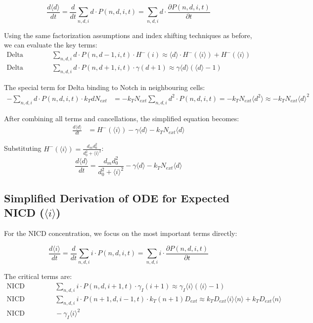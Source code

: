 \documentclass{article}
\begin{document}
\begin{flushleft}
$$\frac{d\langle d \rangle}{dt} = \frac{d}{dt}\sum_{n,d,i} d \cdot P(n,d,i,t) = \sum_{n,d,i} d \cdot \frac{\partial P(n,d,i,t)}{\partial t}$$

Using the same factorization assumptions and index shifting techniques as before, we can evaluate the key terms:
\begin{align*}
\text{Delta production term:} &\quad \sum_{n,d,i} d \cdot P(n,d-1,i,t) \cdot H^-(i) \approx \langle d \rangle \cdot H^-(\langle i \rangle) + H^-(\langle i \rangle) \\
\text{Delta decay term:} &\quad \sum_{n,d,i} d \cdot P(n,d+1,i,t) \cdot \gamma(d+1) \approx \gamma \langle d \rangle (\langle d \rangle - 1)
\end{align*}

The special term for Delta binding to Notch in neighbouring cells:
\begin{align*}
-\sum_{n,d,i} d \cdot P(n,d,i,t) \cdot k_T d N_{ext} &= -k_T N_{ext} \sum_{n,d,i} d^2 \cdot P(n,d,i,t) = -k_T N_{ext} \langle d^2 \rangle \approx -k_T N_{ext} \langle d \rangle^2
\end{align*}

After combining all terms and cancellations, the simplified equation becomes:
\begin{align*}
\frac{d\langle d \rangle}{dt} &= H^-(\langle i \rangle) - \gamma \langle d \rangle - k_T N_{ext} \langle d \rangle
\end{align*}

Substituting $H^-(\langle i \rangle)=\frac{d_m d_0^2}{d_0^2 + \langle i \rangle^2}$:
$$\frac{d\langle d \rangle}{dt} = \frac{d_m d_0^2}{d_0^2 + \langle i \rangle^2} - \gamma \langle d \rangle - k_T N_{ext} \langle d \rangle$$

\subsection*{Simplified Derivation of ODE for Expected NICD ($\langle i \rangle$)}

For the NICD concentration, we focus on the most important terms directly:

$$\frac{d\langle i \rangle}{dt} = \frac{d}{dt}\sum_{n,d,i} i \cdot P(n,d,i,t) = \sum_{n,d,i} i \cdot \frac{\partial P(n,d,i,t)}{\partial t}$$

The critical terms are:
\begin{align*}
\text{NICD decay:} &\quad \sum_{n,d,i} i \cdot P(n,d,i+1,t) \cdot \gamma_I(i+1) \approx \gamma_I \langle i \rangle (\langle i \rangle - 1) \\
\text{NICD production:} &\quad \sum_{n,d,i} i \cdot P(n+1,d,i-1,t) \cdot k_T(n+1)D_{ext} \approx k_T D_{ext} \langle i \rangle \langle n \rangle + k_T D_{ext} \langle n \rangle \\
\text{NICD degradation term:} &\quad -\gamma_I \langle i \rangle^2
\end{align*}


\end{flushleft}
\end{document}
